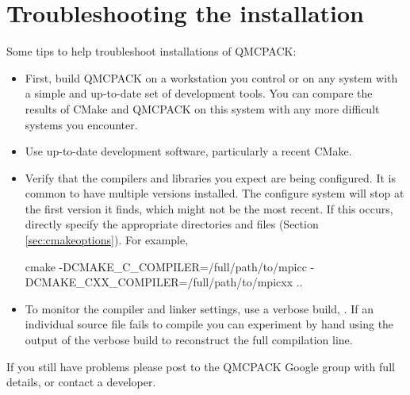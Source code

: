 \section{Troubleshooting the installation}
\label{sec:troubleshoot}
Some tips to help troubleshoot installations of QMCPACK:
\begin{itemize}
\item First, build QMCPACK on a workstation you control or on any
  system with a simple and up-to-date set of development
  tools. You can compare the results of CMake and QMCPACK on this
  system with any more difficult systems you encounter.
\item Use up-to-date development software, particularly a recent
  CMake.
\item Verify that the compilers and libraries you expect are
  being configured. It is common to have multiple versions
  installed. The configure system will stop at the first version it
  finds, which might not be the most recent. If this occurs, directly specify the appropriate
  directories and files (Section
  \ref{sec:cmakeoptions}). For example, 
  \begin{shade}
  cmake -DCMAKE_C_COMPILER=/full/path/to/mpicc -DCMAKE_CXX_COMPILER=/full/path/to/mpicxx ..
  \end{shade}
\item To monitor the compiler and linker settings, use a verbose build, . If an individual source file fails to compile you
  can experiment by hand using the output of the verbose build to
  reconstruct the full compilation line.
\end{itemize}

If you still have problems please post to the QMCPACK Google group with full
details, or contact a developer.

